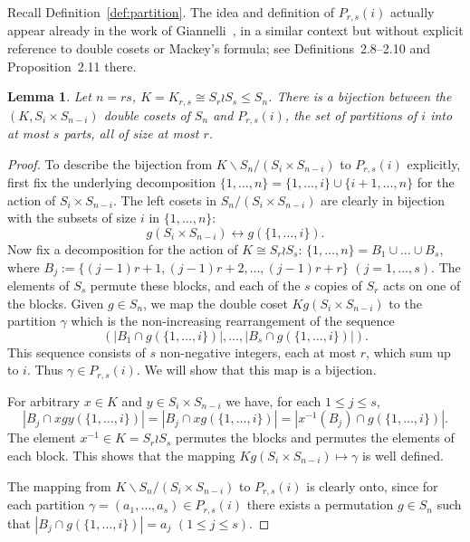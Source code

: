 \documentclass[10pt]{article}
\newtheorem{lemma}[theorem]{Lemma}
\theoremstyle{definition}
\newcommand{\card}[1]{\ensuremath{\left|#1\right|}}
\begin{document}
Recall Definition~\ref{def:partition}. 
The idea and definition of $P_{r,s}(i)$ actually appear
already in the work of Giannelli~\cite{Giannelli}, 
in a similar context but without explicit reference to double cosets or Mackey's formula; 
see Definitions~2.8--2.10 and Proposition~2.11 there.



\begin{lemma}\label{lemma:parametrization}
    Let $n = rs$, $K = K_{r,s} \cong S_r \wr S_s \le S_n$.
    There is a bijection between the $(K,S_i\times S_{n-i})$ double cosets of $S_n$ and $P_{r,s}(i)$, the set of partitions of $i$ into at most $s$ parts, all of size at most $r$. 
\end{lemma}

\begin{proof}
    To describe the bijection from $K\backslash S_n/(S_i \times S_{n-i})$ to $P_{r,s}(i)$ explicitly,
    first fix the underlying decomposition $\{1, \ldots, n\} = \{1,\ldots,i\} \cup \{i+1,\ldots, n\}$ for the action of $S_i\times S_{n-i}$. 
    The left cosets in $S_n/(S_i \times S_{n-i})$ are clearly in bijection with the subsets of size $i$ in $\{1, \ldots, n\}$:
    \[
        g(S_i \times S_{n-i}) \longleftrightarrow g(\{1, \ldots, i\}).
    \]
    Now fix a decomposition for the action of $K \cong S_r \wr S_s$: 
    $\{1, \ldots, n\} = B_1 \cup \ldots \cup B_s$,
    where $B_j := \{(j-1)r+1,(j-1)r+2,\ldots,(j-1)r+r\}$ $(j = 1,\ldots,s)$. 
    The elements of $S_s$ permute these blocks,
    and each of the $s$ copies of $S_r$ acts on one of the blocks.
    Given $g \in S_n$, we map the double coset $K g (S_i \times S_{n-i})$ to the partition $\gamma$ which is the non-increasing rearrangement of the sequence
    \[
        (\card{B_1 \cap g(\{1,\ldots,i\})}, \ldots, \card{B_s \cap g(\{1,\ldots,i\})}).
    \]
    This sequence consists of $s$ non-negative integers, each at most $r$, which sum up to $i$. Thus $\gamma \in P_{r,s}(i)$.
    We will show that this map is a bijection.

    For arbitrary $x\in K$ and $y\in S_i\times S_{n-i}$ we have,
    for each $1 \le j \le s$,
    \[
        \card{B_j \cap xgy(\{1,\ldots,i\})} 
        = \card{B_j \cap xg(\{1,\ldots,i\})}
        = \card{x^{-1}(B_j) \cap g(\{1,\ldots,i\})}.
    \]
    The element $x^{-1} \in K = S_r \wr S_s$ permutes the blocks and permutes the elements of each block. This shows that the mapping $Kg(S_i \times S_{n-i}) \mapsto \gamma$ is well defined.

    The mapping from $K\backslash S_n/(S_i \times S_{n-i})$ to $P_{r,s}(i)$ is clearly onto, since
    for each partition $\gamma = (a_1,\ldots,a_s) \in P_{r,s}(i)$ there exists a permutation $g \in S_n$ such that  $\card{B_j \cap g(\{1,\ldots,i\})} = a_j$ $(1 \le j \le s)$. 
		

\end{proof}
\end{document}
